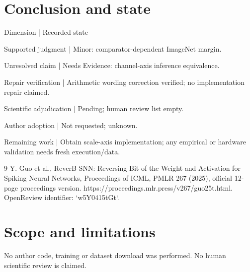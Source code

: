 \documentclass[10pt]{article}
\begin{document}
\section*{Conclusion and state}
Dimension | Recorded state\par
Supported judgment | Minor: comparator-dependent ImageNet margin.\par
Unresolved claim | Needs Evidence: channel-axis inference equivalence.\par
Repair verification | Arithmetic wording correction verified; no implementation repair claimed.\par
Scientific adjudication | Pending; human review list empty.\par
Author adoption | Not requested; unknown.\par
Remaining work | Obtain scale-axis implementation; any empirical or hardware validation needs fresh execution/data.\par
9 Y. Guo et al., ReverB-SNN: Reversing Bit of the Weight and Activation for Spiking Neural Networks, Proceedings of ICML, PMLR 267 (2025), official 12-page proceedings version. https://proceedings.mlr.press/v267/guo25t.html. OpenReview identifier: `w5Y0415tGt`.\par
\section*{Scope and limitations}
No author code, training or dataset download was performed. No human scientific review is claimed.\par
\end{document}
